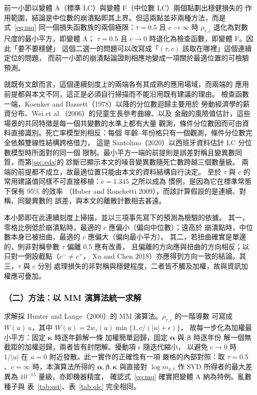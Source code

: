 \documentclass[UTF8, fontset=macnew, a4paper, 12pt]{ctexart}
\newcommand{\cn}[1]{\ding{\number\numexpr171+#1\relax}}
\begin{document}
前一小節以變體 A（標準 LC）與變體 F（中位數 LC）兩個點劃出穩健損失的
作用範圍，結論是中位數的崩潰點即其上界。但這兩點並非兩種方法，而是
式~\eqref{eq:mq} 同一個損失函數族的兩個極限：$\tau=0.5$ 且
$c\to\infty$ 時 $\rho_{\tau,c}$ 退化為對數尺度的最小平方，即變體 A；
$\tau=0.5$ 且 $c\to0$ 時退化為檢查函數，即變體 F。因此「要不要穩健」
這個二選一的問題可以改寫成「$(\tau,c)$ 該取在哪裡」這個連續定位的問題，
而前一小節的崩潰點論證則相應地變成一項關於最適位置的可檢驗預測。

就既有文獻而言，這個連續刻度上的兩端各有其成熟的應用場域，而兩端的
應用前提都與本文不同，這正是必須自行掃描而不能沿用既有建議的理由。
檢查函數一端，Koenker and Bassett（1978）以降的分位數迴歸主要用於
勞動經濟學的薪資分布、Wei et al.（2006）的兒童生長參考曲線、以及
金融的風險值估計，這些場景的共同特徵是每一個共變數的水準上都有大量
觀測，條件分位數因而可由資料直接識別。死亡率模型則相反：每個
年齡--年份格只有一個觀測，條件分位數完全依賴雙線性結構跨格借力，
這是 Santolino（2020）以西班牙資料估計 LC 分位數模型時所面對的同一個
限制。最小平方一端的前提則是誤差對稱且變異數同質，而第\ref{sec:eda}的
診斷\cn{3}已顯示本文的噪音變異數隨死亡數跨越三個數量級。
兩端的前提都不成立，故最適位置只能由本文的資料結構自行決定。
至於 $\tau$ 與 $c$ 的常用建議值同樣不可直接移植：$c=1.345$ 之所以成為
慣例，是因為它在標準常態下保有 95\% 的效率
（Huber and Ronchetti 2009），而該計算假設的是連續、對稱、同變異數的
誤差，與本文的離散計數相去甚遠。

本小節即在此連續刻度上掃描，並以三項事先寫下的預測為檢驗的依據。
其一，零格比例低於崩潰點時，最適的 $c$ 應偏小（偏向中位數）；遠高於
崩潰點時，中位數本身已被扭曲，最適的 $c$ 應偏大（偏向最小平方）。
其二，若扭曲確實是單邊的，則非對稱參數 $\tau$ 偏離 0.5 應有改善，
且偏離的方向應與扭曲的方向相反；以只對一側設截點（$c^-\ne c^+$，
Xu and Chen 2018）亦應得到方向一致的結論。其三，$\tau$ 與 $c$ 分別
處理損失的非對稱與穩健程度，二者皆不觸及加權，故與資訊加權應可疊加。

\subsubsection{（二）方法：以 MM 演算法統一求解}

求解採 Hunter and Lange（2000）的 MM 演算法。$\rho_{\tau,c}$ 的一階導數
可寫成 $W(u)\,u$，其中 $W(u)=2w_\tau(u)\min\{1,c/(|u|+\epsilon)\}$，
故每一步化為加權最小平方：固定 $\boldsymbol{\kappa}$ 時逐年齡解一條
加權簡單迴歸，固定 $\boldsymbol{\alpha}$ 與 $\boldsymbol{\beta}$ 時逐年份
解一個無截距的加權迴歸，兩者皆有封閉解。擾動項 $\epsilon$ 隨迭代縮小，
以避免 $c\to0$ 時 $1/|u|$ 在 $u=0$ 附近發散。此一實作的正確性有一項
嚴格的內部對照：取 $\tau=0.5$、$c=\infty$ 時，本演算法所得的
$\boldsymbol{\alpha},\boldsymbol{\beta},\boldsymbol{\kappa}$ 與直接對
$\log m_{x,t}$ 作 SVD 所得者的最大差異為 $10^{-15}$ 量級，亦即機器精度，
確認式~\eqref{eq:mq} 確實把變體 A 納為特例。亂數種子與
表~\ref{tab:est}、表~\ref{tab:qlc} 完全相同。
\end{document}
